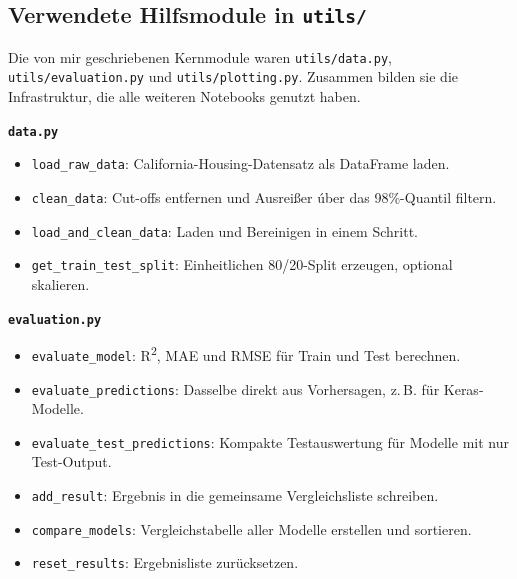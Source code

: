 \documentclass[9pt,a4paper,twocolumn,twoside]{tau-class/tau}
\begin{document}
\subsection*{Verwendete Hilfsmodule in \texttt{utils/}}
Die von mir geschriebenen Kernmodule waren \texttt{utils/data.py}, \texttt{utils/evaluation.py} und \texttt{utils/plotting.py}. Zusammen bilden sie die Infrastruktur, die alle weiteren Notebooks genutzt haben.

\small
\textbf{\texttt{data.py}}\par
\begin{itemize}[leftmargin=*,itemsep=0.12em,topsep=0.2em]
    \item \texttt{load\_raw\_data}: California-Housing-Datensatz als DataFrame laden.
    \item \texttt{clean\_data}: Cut-offs entfernen und Ausrei\ss{}er \'uber das 98\%-Quantil filtern.
    \item \texttt{load\_and\_clean\_data}: Laden und Bereinigen in einem Schritt.
    \item \texttt{get\_train\_test\_split}: Einheitlichen 80/20-Split erzeugen, optional skalieren.
\end{itemize}

\textbf{\texttt{evaluation.py}}\par
\begin{itemize}[leftmargin=*,itemsep=0.12em,topsep=0.2em]
    \item \texttt{evaluate\_model}: R\textsuperscript{2}, MAE und RMSE f\"ur Train und Test berechnen.
    \item \texttt{evaluate\_predictions}: Dasselbe direkt aus Vorhersagen, z.\,B. f\"ur Keras-Modelle.
    \item \texttt{evaluate\_test\_predictions}: Kompakte Testauswertung f\"ur Modelle mit nur Test-Output.
    \item \texttt{add\_result}: Ergebnis in die gemeinsame Vergleichsliste schreiben.
    \item \texttt{compare\_models}: Vergleichstabelle aller Modelle erstellen und sortieren.
    \item \texttt{reset\_results}: Ergebnisliste zur\"ucksetzen.
\end{itemize}
\end{document}

